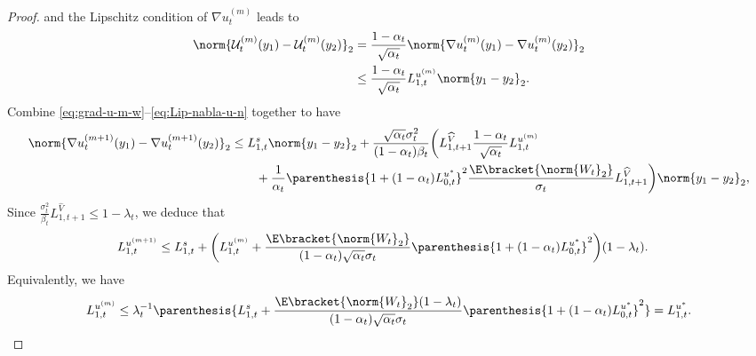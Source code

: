 \documentclass{article}
\begin{document}
\begin{proof}
and the Lipschitz condition of $\nabla u_t^{(m)}$ leads to
\begin{align}
     \norm{\mathcal{U}^{(m)}_t(y_1) - \mathcal{U}^{(m)}_t(y_2)}_2 & = \frac{1 - \alpha_{t}}{\sqrt{\alpha_{t}}}\norm{\nabla u_{t}^{(m)}(y_{1}) - \nabla u_{t}^{(m)}(y_{2})}_2 \nonumber \\ & \leq \frac{1 - \alpha_{t}}{\sqrt{\alpha_{t}}} L_{1, t}^{u^{(m)}}\norm{y_{1} - y_{2}}_2. \label{eq:Lip-nabla-u-n}
\end{align}
Combine \eqref{eq:grad-u-m-w}--\eqref{eq:Lip-nabla-u-n} together to have
\begin{align*}
    \norm{\nabla u_{t}^{(m+1)}(y_{1}) - \nabla u_{t}^{(m+1)}(y_{2})}_2 & \leq L_{1, t}^{s}\norm{y_{1} - y_{2}}_2 + \frac{\sqrt{\alpha_{t}}\sigma_{t}^{2}}{(1 - \alpha_{t})\beta_t}\bigg(L_{1, t+1}^{\widehat{V}}\frac{1 - \alpha_{t}}{\sqrt{\alpha_{t}}} L_{1, t}^{u^{(m)}} \\ & \qquad + \frac{1}{\alpha_{t}}\parenthesis{1 + (1 - \alpha_{t})L_{0,t}^{u^{*}}}^{2}\frac{\E\bracket{\norm{W_{t}}_2}}{\sigma_{t}}L_{1, t+1}^{\widehat{V}}\bigg)\norm{y_{1} - y_{2}}_2,
\end{align*}
Since $ \frac{\sigma_{t}^{2}}{\beta_{t}}L_{1, t+1}^{\widehat{V}} \leq 1 - \lambda_{t} $, we deduce that
\begin{align*}
L_{1, t}^{u^{(m+1)}} & \leq L_{1, t}^{s} + \bigg( L_{1, t}^{u^{(m)}} + \frac{\E\bracket{\norm{W_{t}}_2}}{(1 - \alpha_t)\sqrt{\alpha_{t}}\sigma_{t}}\parenthesis{1 + (1 - \alpha_{t})L_{0,t}^{u^{*}}}^{2}\bigg)(1 - \lambda_t).
\end{align*}
Equivalently, we have
\begin{align*}
    L_{1, t}^{u^{(m)}} \leq \lambda_{t}^{-1}\parenthesis{L_{1, t}^{s} +  \frac{\E\bracket{\norm{W_{t}}_2}(1 - \lambda_t)}{(1 - \alpha_t)\sqrt{\alpha_{t}}\sigma_{t}}\parenthesis{1 + (1 - \alpha_{t})L_{0,t}^{u^{*}}}^{2}} = L_{1, t}^{u^*}.
\end{align*}


\end{proof}
\end{document}
